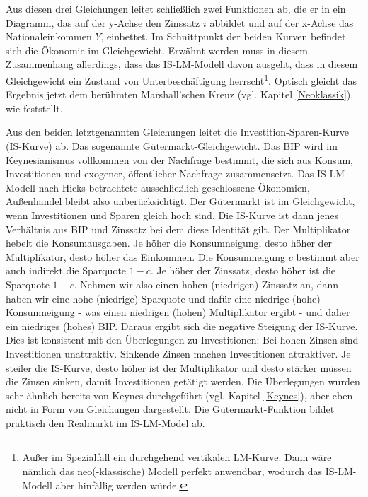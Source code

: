 Aus diesen drei Gleichungen leitet \textcite{Hicks1937} schließlich zwei Funktionen ab, die er in ein Diagramm, das auf der y-Achse den Zinssatz $i$ abbildet und auf der x-Achse das Nationaleinkommen $Y$, einbettet. Im Schnittpunkt der beiden Kurven befindet sich die Ökonomie im Gleichgewicht. Erwähnt werden muss in diesem Zusammenhang allerdings, dass das IS-LM-Modell davon ausgeht, dass in diesem Gleichgewicht  ein Zustand von Unterbeschäftigung herrscht\footnote{Außer im Spezialfall ein durchgehend vertikalen LM-Kurve. Dann wäre nämlich das neo(-klassische) Modell perfekt anwendbar, wodurch das IS-LM-Modell aber hinfällig werden würde.}. Optisch gleicht das Ergebnis jetzt dem berühmten Marshall'schen Kreuz (vgl. Kapitel \ref{Neoklassik}), wie \textcite[S. 153]{Hicks1937} feststellt.

Aus den beiden letztgenannten Gleichungen leitet \textcite{Hicks1937} die Investition-Sparen-Kurve (IS-Kurve) ab. Das sogenannte Gütermarkt-Gleichgewicht. Das BIP wird im Keynesianismus vollkommen von der Nachfrage bestimmt, die sich aus Konsum, Investitionen und exogener, öffentlicher Nachfrage zusammensetzt. Das IS-LM-Modell nach Hicks betrachtete ausschließlich geschlossene Ökonomien, Außenhandel bleibt also unberücksichtigt. Der Gütermarkt ist im Gleichgewicht, wenn Investitionen und Sparen gleich hoch sind. Die IS-Kurve ist dann jenes Verhältnis aus BIP und Zinssatz bei dem diese Identität gilt. Der Multiplikator hebelt die Konsumausgaben. Je höher die Konsumneigung, desto höher der Multiplikator, desto höher das Einkommen. Die Konsumneigung $c$ bestimmt aber auch indirekt die Sparquote $1-c$. Je höher der Zinssatz, desto höher ist die Sparquote $1-c$. Nehmen wir also einen hohen (niedrigen) Zinssatz an, dann haben wir eine hohe (niedrige) Sparquote und dafür eine niedrige (hohe) Konsumneigung - was einen niedrigen (hohen) Multiplikator ergibt - und daher ein niedriges (hohes) BIP. Daraus ergibt sich die negative Steigung der IS-Kurve. Dies ist konsistent mit den Überlegungen zu Investitionen: Bei hohen Zinsen sind Investitionen unattraktiv. Sinkende Zinsen machen Investitionen attraktiver. Je steiler die IS-Kurve, desto höher ist der Multiplikator und desto stärker müssen die Zinsen sinken, damit Investitionen getätigt werden. Die Überlegungen wurden sehr ähnlich bereits von Keynes durchgeführt (vgl. Kapitel \ref{Keynes}), aber eben nicht in Form von Gleichungen dargestellt. Die Gütermarkt-Funktion bildet praktisch den Realmarkt im IS-LM-Model ab. 

